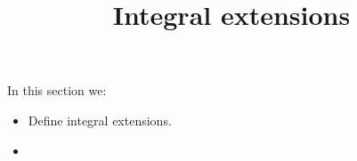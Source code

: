\documentclass{ximera}
\title{Integral extensions}
\begin{document}
\begin{abstract}
\end{abstract}

\maketitle

In this section we:

\begin{itemize}
\item Define integral extensions.
\item 
\end{itemize}
\end{document}
